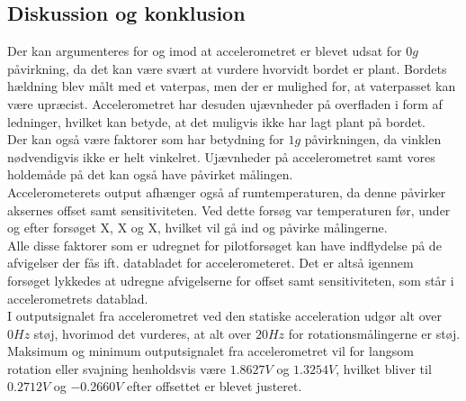 \subsection{Diskussion og konklusion}
Der kan argumenteres for og imod at accelerometret er blevet udsat for $0g$ påvirkning, da det kan være svært at vurdere hvorvidt bordet er plant. Bordets hældning blev målt med et vaterpas, men der er mulighed for, at vaterpasset kan være upræcist. Accelerometret har desuden ujævnheder på overfladen i form af ledninger, hvilket kan betyde, at det muligvis ikke har lagt plant på bordet. \\
Der kan også være faktorer som har betydning for $1g$ påvirkningen, da vinklen nødvendigvis ikke er helt vinkelret. Ujævnheder på accelerometret samt vores holdemåde på det kan også have påvirket målingen. \\
Accelerometerets output afhænger også af rumtemperaturen, da denne påvirker aksernes offset samt sensitiviteten. Ved dette forsøg var temperaturen før, under og efter forsøget X, X og X, hvilket vil gå ind og påvirke målingerne. \\
Alle disse faktorer som er udregnet for pilotforsøget kan have indflydelse på de afvigelser der fås ift. databladet for accelerometeret. Det er altså igennem forsøget lykkedes at udregne afvigelserne for offset samt sensitiviteten, som står i accelerometrets datablad.  \\

I outputsignalet fra accelerometret ved den statiske acceleration udgør alt over $0Hz$ støj, hvorimod det vurderes, at alt over $20Hz$ for rotationsmålingerne er støj. Maksimum og minimum outputsignalet fra accelerometret vil for langsom rotation eller svajning henholdsvis være $1.8627V$ og $1.3254V$, hvilket bliver til $0.2712V$ og $-0.2660V$ efter offsettet er blevet justeret. \\